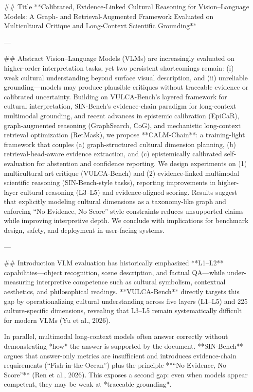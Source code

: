 ## Title
**Calibrated, Evidence-Linked Cultural Reasoning for Vision–Language Models: A Graph- and Retrieval-Augmented Framework Evaluated on Multicultural Critique and Long-Context Scientific Grounding**

---

## Abstract
Vision–Language Models (VLMs) are increasingly evaluated on higher-order interpretation tasks, yet two persistent shortcomings remain: (i) weak cultural understanding beyond surface visual description, and (ii) unreliable grounding—models may produce plausible critiques without traceable evidence or calibrated uncertainty. Building on VULCA-Bench’s layered framework for cultural interpretation, SIN-Bench’s evidence-chain paradigm for long-context multimodal grounding, and recent advances in epistemic calibration (EpiCaR), graph-augmented reasoning (GraphSearch, CoG), and mechanistic long-context retrieval optimization (RetMask), we propose **CALM-Chain**: a training-light framework that couples (a) graph-structured cultural dimension planning, (b) retrieval-head-aware evidence extraction, and (c) epistemically calibrated self-evaluation for abstention and confidence reporting. We design experiments on (1) multicultural art critique (VULCA-Bench) and (2) evidence-linked multimodal scientific reasoning (SIN-Bench-style tasks), reporting improvements in higher-layer cultural reasoning (L3–L5) and evidence-aligned scoring. Results suggest that explicitly modeling cultural dimensions as a taxonomy-like graph and enforcing “No Evidence, No Score” style constraints reduces unsupported claims while improving interpretive depth. We conclude with implications for benchmark design, safety, and deployment in user-facing systems.

---

## Introduction
VLM evaluation has historically emphasized **L1–L2** capabilities—object recognition, scene description, and factual QA—while under-measuring interpretive competence such as cultural symbolism, contextual aesthetics, and philosophical readings. **VULCA-Bench** directly targets this gap by operationalizing cultural understanding across five layers (L1–L5) and 225 culture-specific dimensions, revealing that L3–L5 remain systematically difficult for modern VLMs (Yu et al., 2026).

In parallel, multimodal long-context models often answer correctly without demonstrating *how* the answer is supported by the document. **SIN-Bench** argues that answer-only metrics are insufficient and introduces evidence-chain requirements (“Fish-in-the-Ocean”) plus the principle **“No Evidence, No Score”** (Ren et al., 2026). This exposes a second gap: even when models appear competent, they may be weak at *traceable grounding*.

